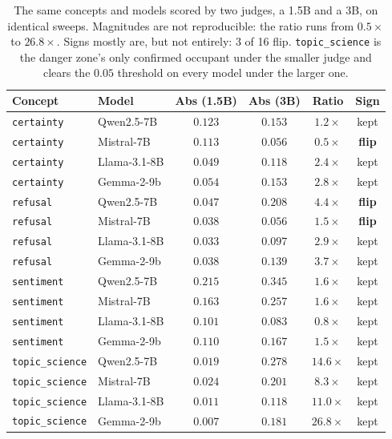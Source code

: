 \begin{table}[htbp]
  \caption{The same concepts and models scored by two judges, a 1.5B and a
  3B, on identical sweeps. Magnitudes are not reproducible: the ratio runs from
  $0.5 \times$ to $26.8 \times$.
  Signs mostly are, but not entirely: 3 of 16 flip.
  \texttt{topic\_science} is the danger zone's only confirmed occupant
  under the smaller judge and clears the $0.05$ threshold on every model under
  the larger one.}
  \label{tab:rejudge}
  \centering
  \footnotesize
  \begin{tabular}{llcccc}
    \toprule
    Concept & Model & Abs (1.5B) & Abs (3B) & Ratio & Sign \\
    \midrule
    \texttt{certainty} & Qwen2.5-7B & $0.123$ & $0.153$ & $1.2\times$ & kept \\
    \texttt{certainty} & Mistral-7B & $0.113$ & $0.056$ & $0.5\times$ & \textbf{flip} \\
    \texttt{certainty} & Llama-3.1-8B & $0.049$ & $0.118$ & $2.4\times$ & kept \\
    \texttt{certainty} & Gemma-2-9b & $0.054$ & $0.153$ & $2.8\times$ & kept \\
    \texttt{refusal} & Qwen2.5-7B & $0.047$ & $0.208$ & $4.4\times$ & \textbf{flip} \\
    \texttt{refusal} & Mistral-7B & $0.038$ & $0.056$ & $1.5\times$ & \textbf{flip} \\
    \texttt{refusal} & Llama-3.1-8B & $0.033$ & $0.097$ & $2.9\times$ & kept \\
    \texttt{refusal} & Gemma-2-9b & $0.038$ & $0.139$ & $3.7\times$ & kept \\
    \texttt{sentiment} & Qwen2.5-7B & $0.215$ & $0.345$ & $1.6\times$ & kept \\
    \texttt{sentiment} & Mistral-7B & $0.163$ & $0.257$ & $1.6\times$ & kept \\
    \texttt{sentiment} & Llama-3.1-8B & $0.101$ & $0.083$ & $0.8\times$ & kept \\
    \texttt{sentiment} & Gemma-2-9b & $0.110$ & $0.167$ & $1.5\times$ & kept \\
    \texttt{topic\_science} & Qwen2.5-7B & $0.019$ & $0.278$ & $14.6\times$ & kept \\
    \texttt{topic\_science} & Mistral-7B & $0.024$ & $0.201$ & $8.3\times$ & kept \\
    \texttt{topic\_science} & Llama-3.1-8B & $0.011$ & $0.118$ & $11.0\times$ & kept \\
    \texttt{topic\_science} & Gemma-2-9b & $0.007$ & $0.181$ & $26.8\times$ & kept \\
    \bottomrule
  \end{tabular}
\end{table}
